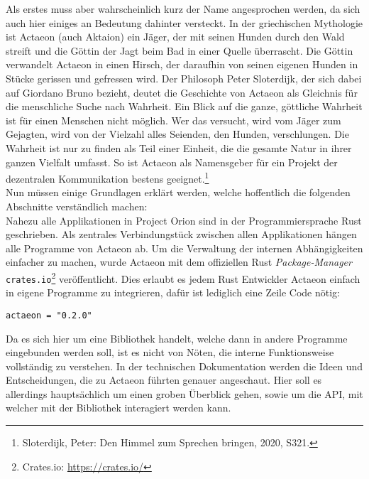 \documentclass[11pt]{article}
\begin{document}
\noindent Als erstes muss aber wahrscheinlich kurz der Name
angesprochen werden, da sich auch hier einiges an Bedeutung dahinter
versteckt. In der griechischen Mythologie ist Actaeon (auch Aktaion)
ein Jäger, der mit seinen Hunden durch den Wald streift und die Göttin
der Jagt beim Bad in einer Quelle überrascht. Die Göttin verwandelt
Actaeon in einen Hirsch, der daraufhin von seinen eigenen Hunden in
Stücke gerissen und gefressen wird. Der Philosoph Peter Sloterdijk,
der sich dabei auf Giordano Bruno bezieht, deutet die Geschichte von
Actaeon als Gleichnis für die menschliche Suche nach Wahrheit. Ein
Blick auf die ganze, göttliche Wahrheit ist für einen Menschen nicht
möglich. Wer das versucht, wird vom Jäger zum Gejagten, wird von der
Vielzahl alles Seienden, den Hunden, verschlungen. Die Wahrheit ist
nur zu finden als Teil einer Einheit, die die gesamte Natur in ihrer
ganzen Vielfalt umfasst. So ist Actaeon als Namensgeber für ein
Projekt der dezentralen Kommunikation bestens geeignet.\footnote{Sloterdijk, Peter: Den Himmel zum Sprechen bringen, 2020, S321.}\\

\noindent Nun müssen einige Grundlagen erklärt werden, welche
hoffentlich die folgenden Abschnitte verständlich machen:\\
Nahezu alle Applikationen in Project Orion sind in der
Programmiersprache Rust geschrieben. Als zentrales Verbindungstück
zwischen allen Applikationen hängen alle Programme von Actaeon ab. Um
die Verwaltung der internen Abhängigkeiten einfacher zu machen, wurde
Actaeon mit dem offiziellen Rust \emph{Package-Manager} \texttt{crates.io}\footnote{Crates.io: \url{https://crates.io/}}
veröffentlicht. Dies erlaubt es jedem Rust Entwickler Actaeon einfach
in eigene Programme zu integrieren, dafür ist lediglich eine Zeile
Code nötig:
\begin{verbatim}
actaeon = "0.2.0"
\end{verbatim}

\noindent Da es sich hier um eine Bibliothek handelt, welche dann in
andere Programme eingebunden werden soll, ist es nicht von Nöten, die
interne Funktionsweise vollständig zu verstehen. In der technischen
Dokumentation werden die Ideen und Entscheidungen, die zu Actaeon
führten genauer angeschaut. Hier soll es allerdings hauptsächlich um
einen groben Überblick gehen, sowie um die API, mit welcher mit der
Bibliothek interagiert werden kann.\\
\end{document}
